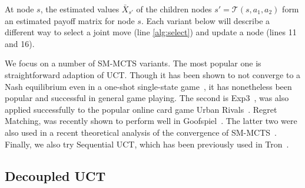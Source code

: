 \documentclass[conference]{IEEEtran}
\newcommand{\cA}{\mathcal{A}}
\newcommand{\cT}{\mathcal{T}}
\begin{document}
At node $s$, the estimated values $\bar{X}_{s'}$ of the children nodes $s' = \cT(s,a_1,a_2)$ 
form an estimated payoff matrix for node $s$. 
Each variant below will describe a different way to select a joint 
move (line \ref{alg:select}) and update a node (lines 11 and 16). 


We focus on a number of SM-MCTS variants. The most popular one is straightforward adaption of UCT. 
Though it has been shown to not converge to a Nash equilibrium even in a one-shot single-state 
game~\cite{Shafiei09}, it has nonetheless been popular and successful in general game playing. 
The second is Exp3~\cite{Exp3}, was also applied successfully to the popular online card game 
Urban Rivals~\cite{Teytaud11Upper,StPierre12Online}. 
Regret Matching, was recently shown to perform well in Goofspiel~\cite{Lanctot13Goofspiel}.
The latter two were also used in a recent theoretical analysis of the convergence of SM-MCTS~\cite{Lisy13Computing}.
Finally, we also try Sequential UCT, which has been previously used in Tron~\cite{Samothrakis10Tron,Lanctot13Tron}.

\subsection{Decoupled UCT} 
\end{document}

